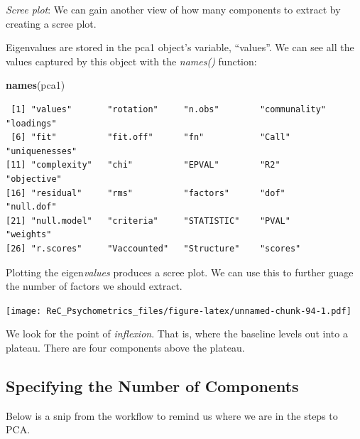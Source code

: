 \documentclass[
  english,
]{book}
\newenvironment{Shaded}{\begin{snugshade}}{\end{snugshade}}
\newcommand{\CommentTok}[1]{\textcolor[rgb]{0.56,0.35,0.01}{\textit{#1}}}
\newcommand{\DataTypeTok}[1]{\textcolor[rgb]{0.13,0.29,0.53}{#1}}
\newcommand{\KeywordTok}[1]{\textcolor[rgb]{0.13,0.29,0.53}{\textbf{#1}}}
\newcommand{\NormalTok}[1]{#1}
\newcommand{\OperatorTok}[1]{\textcolor[rgb]{0.81,0.36,0.00}{\textbf{#1}}}
\newcommand{\StringTok}[1]{\textcolor[rgb]{0.31,0.60,0.02}{#1}}
\begin{document}
\emph{Scree plot}: We can gain another view of how many components to extract by creating a scree plot.

Eigenvalues are stored in the pca1 object's variable, ``values''. We can see all the values captured by this object with the \emph{names()} function:

\begin{Shaded}
\begin{Highlighting}[]
\KeywordTok{names}\NormalTok{(pca1)}
\end{Highlighting}
\end{Shaded}

\begin{verbatim}
 [1] "values"       "rotation"     "n.obs"        "communality"  "loadings"    
 [6] "fit"          "fit.off"      "fn"           "Call"         "uniquenesses"
[11] "complexity"   "chi"          "EPVAL"        "R2"           "objective"   
[16] "residual"     "rms"          "factors"      "dof"          "null.dof"    
[21] "null.model"   "criteria"     "STATISTIC"    "PVAL"         "weights"     
[26] "r.scores"     "Vaccounted"   "Structure"    "scores"      
\end{verbatim}

Plotting the eigen\emph{values} produces a scree plot. We can use this to further guage the number of factors we should extract.

\begin{Shaded}
\end{Shaded}

\texttt{[image: ReC\_Psychometrics\_files/figure-latex/unnamed-chunk-94-1.pdf]}

We look for the point of \emph{inflexion}. That is, where the baseline levels out into a plateau. There are four components above the plateau.

\hypertarget{specifying-the-number-of-components}{%
\subsection{Specifying the Number of Components}\label{specifying-the-number-of-components}}

Below is a snip from the workflow to remind us where we are in the steps to PCA.
\end{document}
